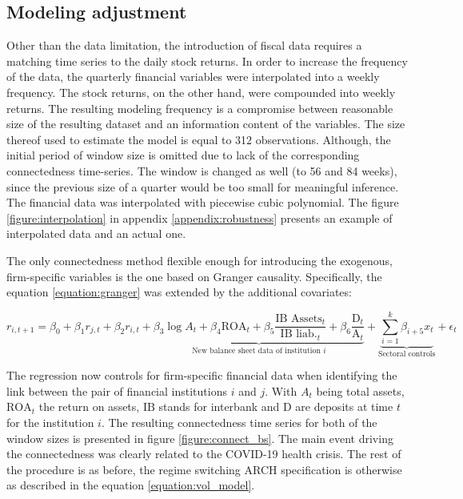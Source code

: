 \documentclass[12pt]{article}
\begin{document}
\subsection{Modeling adjustment}

Other than the data limitation, the introduction of fiscal data requires a matching time series to the daily stock returns. In order to increase the frequency of the data, the quarterly financial variables were interpolated into a weekly frequency. The stock returns, on the other hand, were compounded into weekly returns. The resulting modeling frequency is a compromise between reasonable size of the resulting dataset and an information content of the variables. The size thereof used to estimate the model is equal to 312 observations. Although, the initial period of window size is omitted due to lack of the corresponding connectedness time-series. The window is changed as well (to 56 and 84 weeks), since the previous size of a quarter would be too small for meaningful inference. The financial data was interpolated with piecewise cubic polynomial. The figure \ref{figure:interpolation} in appendix \ref{appendix:robustness} presents an example of interpolated data and an actual one. 

The only connectedness method flexible enough for introducing the exogenous, firm-specific variables is the one based on Granger causality. Specifically, the 
equation \ref{equation:granger} was extended by the additional covariates:

\begin{equation}
	r_{i,t+1} = \beta_0 + \beta_1 r_{j,t} + \beta_2 r_{i, t} + \underbrace{\beta_3 \log{A}_t + \beta_4 \text{ROA}_t + \beta_5 \frac{\text{IB Assets}_t}{\text{IB liab.}_t} + \beta_6 \frac{\text{D}_t}{\text{A}_t}}_{\text{New balance sheet data of institution $i$}} + \underbrace{\sum_{i=1}^{k} \beta_{i+5} x_{t}}_{\text{Sectoral controls}} +\epsilon_t
\end{equation}

The regression now controls for firm-specific financial data when identifying the link between the pair of financial institutions $i$ and $j$. With $A_t$ being total assets, $\text{ROA}_t$ the return on assets, $\text{IB}$ stands for interbank and $\text{D}$ are deposits at time $t$ for the institution $i$. The resulting connectedness time series for both of the window sizes is presented in figure \ref{figure:connect_bs}. The main event driving the connectedness was clearly related to the COVID-19 health crisis. The rest of the procedure is as before, the regime switching ARCH specification is otherwise as described in the equation \ref{equation:vol_model}.
\end{document}
